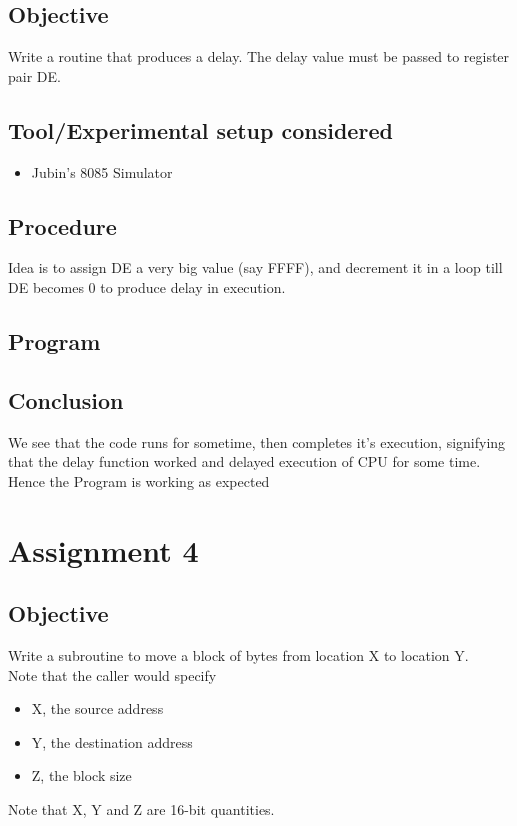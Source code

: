 \documentclass[a4paper]{article} %
\begin{document}
\subsection{Objective}
Write a routine that produces a delay. The delay value must be passed to register pair DE.
\subsection{Tool/Experimental setup considered}
\begin{itemize}
    \item Jubin's 8085 Simulator
\end{itemize}
\subsection{Procedure}
Idea is to assign DE a very big value (say FFFF), and decrement it in a loop till DE becomes 0 to produce delay in execution.
\subsection{Program}

\subsection{Conclusion}
We see that the code runs for sometime, then completes it's execution, signifying that the delay function worked and delayed execution of CPU for some time.\\
Hence the Program is working as expected
\newpage

\section[Move block of data from location X to location Y]{Assignment 4} %
\subsection{Objective}
Write a subroutine to move a block of bytes from location X to location Y.\\
Note that the caller would specify
\begin{itemize}
    \item X, the source address
    \item Y, the destination address
    \item Z, the block size
\end{itemize}
Note that X, Y and Z are 16-bit quantities.
\end{document}
